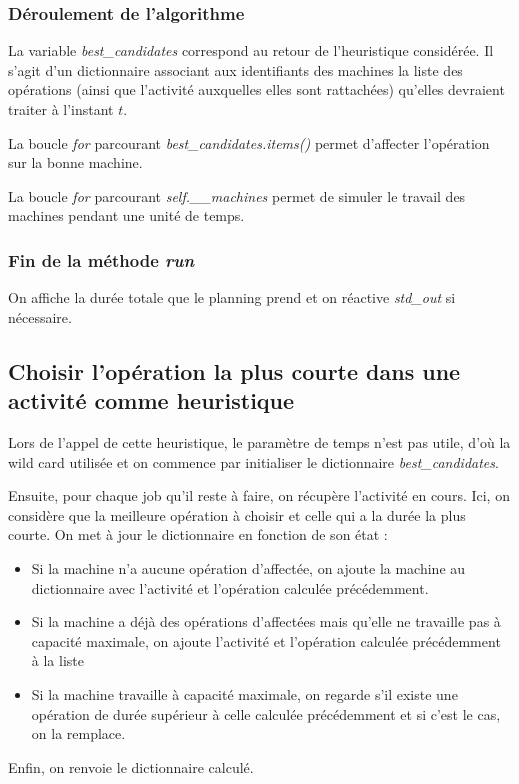 \newpage

\subsubsection{Déroulement de l'algorithme}



La variable \textit{best\_candidates} correspond au retour de l'heuristique considérée. Il s'agit d'un dictionnaire associant aux identifiants des machines la liste des opérations (ainsi que l'activité auxquelles elles sont rattachées) qu'elles devraient traiter à l'instant $t$.

La boucle \textit{for} parcourant \textit{best\_candidates.items()} permet d'affecter l'opération sur la bonne machine.

La boucle \textit{for} parcourant \textit{self.\_\_machines} permet de simuler le travail des machines pendant une unité de temps.

\subsubsection{Fin de la méthode \textit{run}}



On affiche la durée totale que le planning prend et on réactive \textit{std\_out} si nécessaire. 

\newpage

\subsection{Choisir l'opération la plus courte dans une activité comme heuristique}



Lors de l'appel de cette heuristique, le paramètre de temps n'est pas utile, d'où la wild card utilisée et on commence par initialiser le dictionnaire \textit{best\_candidates}.



Ensuite, pour chaque job qu'il reste à faire, on récupère l'activité en cours. Ici, on considère que la meilleure opération à choisir et celle qui a la durée la plus courte. On met à jour le dictionnaire en fonction de son état :
\begin{itemize}
    \item Si la machine n'a aucune opération d'affectée, on ajoute la machine au dictionnaire avec l'activité et l'opération calculée précédemment.
    \item Si la machine a déjà des opérations d'affectées mais qu'elle ne travaille pas à capacité maximale, on ajoute l'activité et l'opération calculée précédemment à la liste
    \item Si la machine travaille à capacité maximale, on regarde s'il existe une opération de durée supérieur à celle calculée précédemment et si c'est le cas, on la remplace.
\end{itemize}



Enfin, on renvoie le dictionnaire calculé.